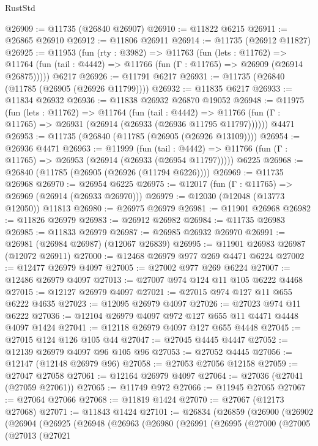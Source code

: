 \begin{lexlean}{RustStd}
\begin{coremodule}
@26909 := @11735 (@26840 @26907)
@26910 := @11822 @6215
@26911 := @26865 @26910
@26912 := @11806 @26911
@26914 := @11735 (@26912 @11827)
@26925 := @11953
    (fun (rty : @3982) =>
    @11763
      (fun (lets : @11762) =>
      @11764 (fun (tail : @4442) => @11766 (fun (Γ : @11765) => @26909 (@26914 @26875)))))
    @6217
@26926 := @11791 @6217
@26931 := @11735 (@26840 (@11785 (@26905 (@26926 @11799))))
@26932 := @11835 @6217
@26933 := @11834 @26932
@26936 := @11838 @26932 @26870 @19052
@26948 := @11975
    (fun (lets : @11762) =>
    @11764
      (fun (tail : @4442) =>
      @11766 (fun (Γ : @11765) => @26931 (@26914 (@26933 (@26936 @11795 @11797))))))
    @4471
@26953 := @11735 (@26840 (@11785 (@26905 (@26926 @13109))))
@26954 := @26936 @4471
@26963 := @11999
    (fun (tail : @4442) => @11766 (fun (Γ : @11765) => @26953 (@26914 (@26933 (@26954 @11797)))))
    @6225
@26968 := @26840 (@11785 (@26905 (@26926 (@11794 @6226))))
@26969 := @11735 @26968
@26970 := @26954 @6225
@26975 := @12017 (fun (Γ : @11765) => @26969 (@26914 (@26933 @26970)))
@26979 := @12030 (@12048 (@13773 @12050)) @11813
@26980 := @26975 @26979
@26981 := @11901 @26968
@26982 := @11826 @26979
@26983 := @26912 @26982
@26984 := @11735 @26983
@26985 := @11833 @26979
@26987 := @26985 @26932 @26970
@26991 := @26981 (@26984 @26987) (@12067 @26839)
@26995 := @11901 @26983 @26987 (@12072 @26911)
@27000 := @12468 @26979 @977 @269 @4471 @6224
@27002 := @12477 @26979 @4097
@27005 := @27002 @977 @269 @6224
@27007 := @12486 @26979 @4097
@27013 := @27007 @974 @124 @11 @105 @6222 @4468
@27015 := @12127 @26979 @4097
@27021 := @27015 @974 @127 @11 @655 @6222 @4635
@27023 := @12095 @26979 @4097
@27026 := @27023 @974 @11 @6222
@27036 := @12104 @26979 @4097 @972 @127 @655 @11 @4471 @4448 @4097 @1424
@27041 := @12118 @26979 @4097 @127 @655 @4448
@27045 := @27015 @124 @126 @105 @44
@27047 := @27045 @4445 @4447
@27052 := @12139 @26979 @4097 @96 @105 @96
@27053 := @27052 @4445
@27056 := @12147 (@12148 @26979 @96)
@27058 := @27053 @27056 @12158
@27059 := @27047 @27058
@27061 := @12164 @26979 @4097
@27064 := @27036 (@27041 (@27059 @27061))
@27065 := @11749 @972
@27066 := @11945 @27065
@27067 := @27064 @27066
@27068 := @11819 @1424
@27070 := @27067 (@12173 @27068)
@27071 := @11843 @1424
@27101 := @26834
    (@26859
      (@26900
        (@26902
          (@26904
            (@26925
              (@26948
                (@26963
                  (@26980
                    (@26991
                      (@26995
                        (@27000
                          (@27005
                            (@27013
                              (@27021

\end{coremodule}
\end{lexlean}
